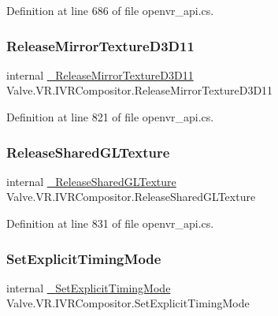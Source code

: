 Definition at line 686 of file openvr\+\_\+api.\+cs.

\mbox{\label{struct_valve_1_1_v_r_1_1_i_v_r_compositor_aa8f5713024670c41ee1018e6692b371d}} 
\subsubsection{\texorpdfstring{ReleaseMirrorTextureD3D11}{ReleaseMirrorTextureD3D11}}
{\footnotesize\ttfamily internal \mbox{\hyperlink{struct_valve_1_1_v_r_1_1_i_v_r_compositor_a79364707bc336637d4790df0a5949c2f}{\+\_\+\+Release\+Mirror\+Texture\+D3\+D11}} Valve.\+V\+R.\+I\+V\+R\+Compositor.\+Release\+Mirror\+Texture\+D3\+D11}



Definition at line 821 of file openvr\+\_\+api.\+cs.

\mbox{\label{struct_valve_1_1_v_r_1_1_i_v_r_compositor_a484fee3e3816dd0734ac90ee12773abc}} 
\subsubsection{\texorpdfstring{ReleaseSharedGLTexture}{ReleaseSharedGLTexture}}
{\footnotesize\ttfamily internal \mbox{\hyperlink{struct_valve_1_1_v_r_1_1_i_v_r_compositor_a8007bc81c8368208327b657a2d9d70b5}{\+\_\+\+Release\+Shared\+G\+L\+Texture}} Valve.\+V\+R.\+I\+V\+R\+Compositor.\+Release\+Shared\+G\+L\+Texture}



Definition at line 831 of file openvr\+\_\+api.\+cs.

\mbox{\label{struct_valve_1_1_v_r_1_1_i_v_r_compositor_aa68aa9770c77aebb53902c7b2418af99}} 
\subsubsection{\texorpdfstring{SetExplicitTimingMode}{SetExplicitTimingMode}}
{\footnotesize\ttfamily internal \mbox{\hyperlink{struct_valve_1_1_v_r_1_1_i_v_r_compositor_acec020845b093a0661c4f86e03fb4390}{\+\_\+\+Set\+Explicit\+Timing\+Mode}} Valve.\+V\+R.\+I\+V\+R\+Compositor.\+Set\+Explicit\+Timing\+Mode}



